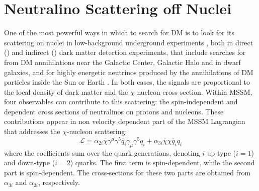 \section{Neutralino Scattering off Nuclei}
One of the most powerful ways in which to search for DM is to look for its scattering on nuclei in low-background underground experiments , both in direct () and indirect () dark matter detection experiments, that include searches for  from DM annihilations near the Galactic Center, Galactic Halo and in dwarf galaxies, and for highly energetic neutrinos produced by the annihilations of DM particles inside the Sun  or Earth . In both cases, the signals are proportional to the local density of dark matter and the $\chi$-nucleon cross-section. %
Within MSSM, four observables can contribute to this scattering: the spin-independent and dependent cross sections of neutralinos on protons and nucleons. 
These contributions appear in non velocity dependent part of the MSSM Lagrangian that addresses the $\chi$-nucleon scattering:
\begin{equation}
\mathcal{L} = \alpha_{2i}\bar{\chi}\gamma^{\mu}\gamma^5\bar{q}_i\gamma_{\mu}\gamma^5q_i + \alpha_{3i}\bar{\chi}\chi\bar{q}_iq_i
\end{equation}
where the coefficients sum over the quark generations, denoting $i$ up-type ($i=1$) and down-type ($i=2$) quarks. The first term is spin-dependent, while the second part is spin-dependent. The cross-sections for these two parts are obtained from $\alpha_{3i}$ and $\alpha_{2i}$, respectively.  

